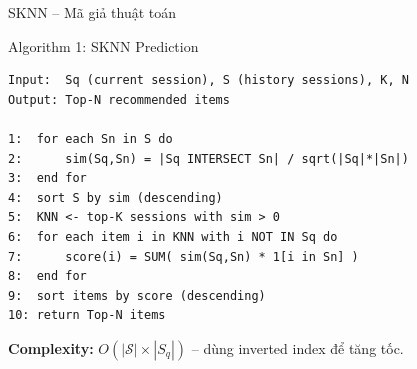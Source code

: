 \documentclass[aspectratio=169, 11pt]{beamer}
\begin{document}
\begin{frame}[fragile]{SKNN -- Mã giả thuật toán}
\vspace{-0.2cm}
\scriptsize
\begin{block}{Algorithm 1: SKNN Prediction}
\begin{verbatim}
Input:  Sq (current session), S (history sessions), K, N
Output: Top-N recommended items

1:  for each Sn in S do
2:      sim(Sq,Sn) = |Sq INTERSECT Sn| / sqrt(|Sq|*|Sn|)
3:  end for
4:  sort S by sim (descending)
5:  KNN <- top-K sessions with sim > 0
6:  for each item i in KNN with i NOT IN Sq do
7:      score(i) = SUM( sim(Sq,Sn) * 1[i in Sn] )
8:  end for
9:  sort items by score (descending)
10: return Top-N items
\end{verbatim}
\end{block}
\small
\textbf{Complexity:} $O(|\mathcal{S}| \times |S_q|)$ -- dùng inverted index để tăng tốc.
\end{frame}
\end{document}
